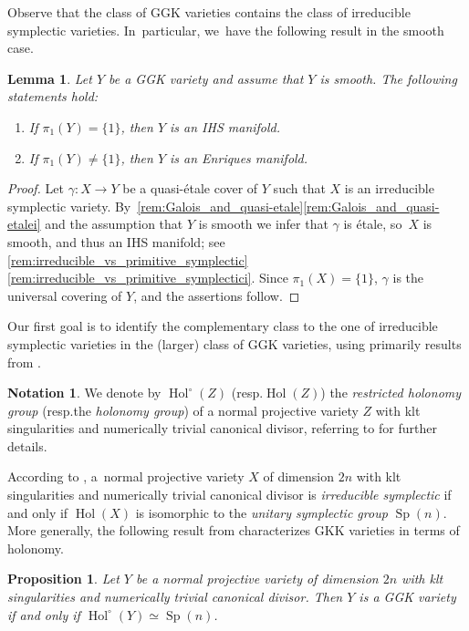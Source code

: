 \documentclass[10pt]{amsart}
\newcommand{\resp}{resp.}
\theoremstyle{plain}
\newtheorem{prop}[thm]{Proposition}
\newtheorem{lem}[thm]{Lemma}
\theoremstyle{definition}
\newtheorem*{notation}{Notation}
\DeclareMathOperator{\Hol}{Hol}
\DeclareMathOperator{\Sp}{Sp}
\begin{document}
Observe that the class of GGK varieties contains the class of irreducible symplectic varieties. In~particular, we~have the following result in the smooth case.

\begin{lem}
\label{lem:smooth_GGK}
Let $Y$ be a GGK variety and assume that $Y$ is smooth. The following statements hold:
\begin{enumerate}
\item
If $\pi_1(Y) = \{ 1 \}$, then $Y$ is an IHS manifold.

\item
If $\pi_1(Y) \neq \{ 1 \}$, then $Y$ is an Enriques manifold.
\end{enumerate}
\end{lem}

\begin{proof}
Let $\gamma \colon X\to Y$ be a quasi-étale cover of $Y$ such that $X$ is an irreducible symplectic variety. By~\autoref{rem:Galois_and_quasi-etale}\eqref{rem:Galois_and_quasi-etalei} and the assumption that $Y$ is smooth we infer that $\gamma$ is étale, so~$X$ is smooth, and thus an IHS manifold; see \autoref{rem:irreducible_vs_primitive_symplectic}\eqref{rem:irreducible_vs_primitive_symplectici}. Since $\pi_1(X) = \{ 1 \}$, $\gamma$ is the universal covering of $Y$, and the assertions follow.
\end{proof}

Our first goal is to identify the complementary class to the one of irreducible symplectic varieties in the (larger) class of GGK varieties, using primarily results from \cite{GKP16a,GKP16b,GGK19}.

\begin{notation}
We denote by $\Hol^\circ (Z)$ (\resp $\Hol(Z)$) the \emph{restricted holonomy group} (\resp the \emph{holonomy group}) of a normal projective variety $Z$ with klt singularities and numerically trivial canonical divisor, referring to \cite{GGK19} for further details.
\end{notation}

According to \cite[Prop.\,F]{GGK19}, a~normal projective variety $X$ of dimension $2n$ with klt singularities and numerically trivial canonical divisor is \emph{irreducible symplectic} if and only if $\Hol(X)$ is isomorphic to the \emph{unitary symplectic group} $\Sp(n)$. More generally, the following result from \cite{GGK19} characterizes GKK varieties in terms of holonomy.

\begin{prop}
\label{prop:characterization_GGK_holonomy}
Let $Y$ be a normal projective variety of dimension $2n$ with klt singularities and numerically trivial canonical divisor. Then $Y$ is a GGK variety if and only if $\Hol^\circ(Y) \simeq \Sp(n)$.
\end{prop}
\end{document}
